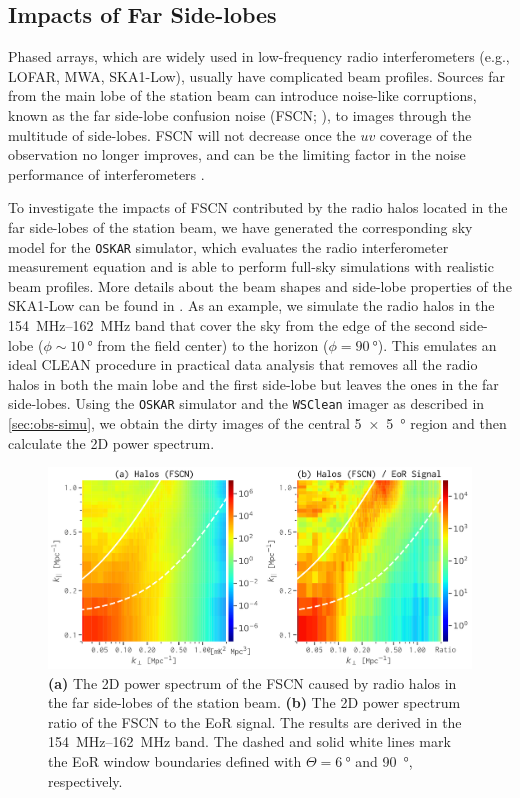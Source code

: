 \documentclass[modern]{aastex62}
\begin{document}
\subsection{Impacts of Far Side-lobes}
\label{sec:far-sidelobes}

Phased arrays, which are widely used in low-frequency radio
interferometers (e.g., LOFAR, MWA, SKA1-Low), usually have complicated
beam profiles.
Sources far from the main lobe of the station beam can introduce
noise-like corruptions, known as the far side-lobe confusion noise
(FSCN; \citealt{smirnov2012}), to images through the multitude of
side-lobes.
FSCN will not decrease once the $uv$ coverage of the observation no
longer improves, and can be the limiting factor in the noise
performance of interferometers \citep{mort2017}.

To investigate the impacts of FSCN contributed by the radio halos
located in the far side-lobes of the station beam, we have generated
the corresponding sky model for the \texttt{OSKAR} simulator,
which evaluates the radio interferometer measurement equation
\citep{smirnov2011} and is able to perform full-sky simulations with
realistic beam profiles.
More details about the beam shapes and side-lobe properties of the
SKA1-Low can be found in \citet{mort2017}.
As an example, we simulate the radio halos in the \SIrange{154}{162}{\MHz}
band that cover the sky from the edge of the second side-lobe
($\phi \sim \SI{10}{\degree}$ from the field center) to the horizon
($\phi = \SI{90}{\degree}$).
This emulates an ideal CLEAN procedure in practical data analysis that
removes all the radio halos in both the main lobe and the first side-lobe
but leaves the ones in the far side-lobes.
Using the \texttt{OSKAR} simulator and the \texttt{WSClean} imager as
described in \autoref{sec:obs-simu}, we obtain the dirty images of the
central \SI[product-units=repeat]{5 x 5}{\degree} region and then
calculate the 2D power spectrum.

\begin{figure}
  \centering
  \includegraphics[width=\textwidth]{ps2d-fscn-band158}
  \caption{\label{fig:ps2d-fscn}%
    \textbf{(a)} The 2D power spectrum of the FSCN caused by radio halos
    in the far side-lobes of the station beam.
    \textbf{(b)} The 2D power spectrum ratio of the FSCN to the EoR signal.
    The results are derived in the \SIrange{154}{162}{\MHz} band.
    The dashed and solid white lines mark the EoR window boundaries
    defined with $\Theta = \SI{6}{\degree}$ and \SI{90}{\degree},
    respectively.
  }
\end{figure}
\end{document}

